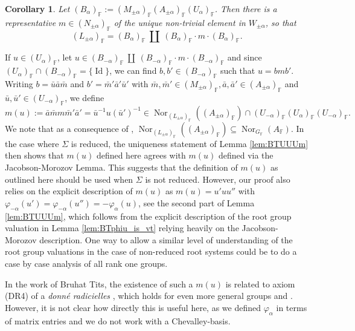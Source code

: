 \documentclass[12pt]{amsart}
\newcommand{\F}{\mathbb{F} }
\numberwithin{equation}{section}
\newtheorem{corollary}[theorem]{Corollary}
\theoremstyle{remark} %
\begin{document}
		\begin{corollary}\label{cor:levi_Bruhat}
			Let $(B_{\alpha})_\F := (M_{\pm \alpha})_\F (A_{\pm \alpha})_\F (U_\alpha)_\F$. Then there is a representative $m \in (N_{\pm \alpha})_\F$ of the unique non-trivial element in $W_{\pm \alpha}$, so that
			$$
			(L_{\pm \alpha})_\F = (B_{\alpha})_\F \ \amalg \   (B_{\alpha})_\F \cdot m \cdot (B_{ \alpha})_\F.
			$$
		\end{corollary}
		If $u \in (U_\alpha)_\F$, let $u \in (B_{-\alpha})_\F \ \amalg \   (B_{-\alpha})_\F \cdot m \cdot (B_{ -\alpha})_\F$ and since $(U_{\alpha})_\F \cap (B_{-\alpha})_\F = \{\operatorname{Id}\}$, we can find $b,b' \in (B_{-\alpha})_\F$ such that $u = bmb'$. Writing $b = \bar{u}\bar{a}\bar{m}$ and $b' = \bar{m}'\bar{a}'\bar{u}'$ with $\bar{m}, \bar{m}' \in (M_{\pm \alpha})_\F, \bar{a},\bar{a}' \in (A_{\pm \alpha})_\F$ and $\bar{u}, \bar{u}'\in (U_{-\alpha})_\F$, we define
		$$
		m(u):= \bar{a} \bar{m} m \bar{m}' \bar{a}' = \bar{u}^{-1} u (\bar{u}')^{-1}  \in \operatorname{Nor}_{(L_{\pm\alpha})_\F }((A_{\pm \alpha})_\F ) \cap (U_{-\alpha})_\F (U_{\alpha})_\F (U_{-\alpha})_\F.
		$$
		We note that as a consequence of \cite[Lemma \ref{I-lem:levi_fixes_A}]{AppAGRCF}, $\operatorname{Nor}_{(L_{\pm\alpha})_\F }((A_{\pm \alpha})_\F ) \subseteq \operatorname{Nor}_{G_\F}(A_\F)$. In the case where $\Sigma$ is reduced, the uniqueness statement of Lemma \ref{lem:BTUUUm} then shows that $m(u)$ defined here agrees with $m(u)$ defined via the Jacobson-Morozov Lemma. This suggests that the definition of $m(u)$ as outlined here should be used when $\Sigma$ is not reduced. However, our proof also relies on the explicit description of $m(u)$ as $m(u) = u'uu''$ with $\varphi_{-\alpha}(u') = \varphi_{-\alpha}(u'') = -\varphi_\alpha(u)$, see the second part of Lemma \ref{lem:BTUUUm}, which follows from the explicit description of the root group valuation in Lemma \ref{lem:BTphiu_is_vt} relying heavily on the Jacobson-Morozov description. One way to allow a similar level of understanding of the root group valuations in the case of non-reduced root systems could be to do a case by case analysis of all rank one groups. %
		
		In the work of Bruhat Tits, the existence of such a $m(u)$ is related to axiom (DR4) of a \emph{donné radicielles} \cite[(6.1.1)]{BrTi}, which holds for even more general groups \cite[(6.1.3)c)]{BrTi} and \cite{BoTi65}. However, it is not clear how directly this is useful here, as we defined $\varphi_\alpha$ in terms of matrix entries and we do not work with a Chevalley-basis.
		
\end{document}
